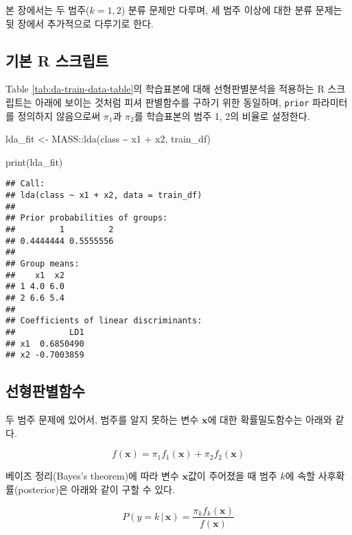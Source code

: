 \documentclass[
]{book}
\newenvironment{Shaded}{\begin{snugshade}}{\end{snugshade}}
\newcommand{\FunctionTok}[1]{\textcolor[rgb]{0.00,0.00,0.00}{#1}}
\newcommand{\NormalTok}[1]{#1}
\newcommand{\OtherTok}[1]{\textcolor[rgb]{0.56,0.35,0.01}{#1}}
\newcommand{\SpecialCharTok}[1]{\textcolor[rgb]{0.00,0.00,0.00}{#1}}
\begin{document}
본 장에서는 두 범주(\(k = 1, 2\)) 분류 문제만 다루며, 세 범주 이상에 대한 분류 문제는 뒷 장에서 추가적으로 다루기로 한다.

\hypertarget{lda-basic-script}{%
\subsection{기본 R 스크립트}\label{lda-basic-script}}

Table \ref{tab:da-train-data-table}의 학습표본에 대해 선형판별분석을 적용하는 R 스크립트는 아래에 보이는 것처럼 피셔 판별함수를 구하기 위한 동일하며, \texttt{prior} 파라미터를 정의하지 않음으로써 \(\pi_1\)과 \(\pi_2\)를 학습표본의 범주 1, 2의 비율로 설정한다.

\begin{Shaded}
\begin{Highlighting}[]
\NormalTok{lda\_fit }\OtherTok{\textless{}{-}}\NormalTok{ MASS}\SpecialCharTok{::}\FunctionTok{lda}\NormalTok{(class }\SpecialCharTok{\textasciitilde{}}\NormalTok{ x1 }\SpecialCharTok{+}\NormalTok{ x2, train\_df)}

\FunctionTok{print}\NormalTok{(lda\_fit)}
\end{Highlighting}
\end{Shaded}

\begin{verbatim}
## Call:
## lda(class ~ x1 + x2, data = train_df)
## 
## Prior probabilities of groups:
##         1         2 
## 0.4444444 0.5555556 
## 
## Group means:
##    x1  x2
## 1 4.0 6.0
## 2 6.6 5.4
## 
## Coefficients of linear discriminants:
##           LD1
## x1  0.6850490
## x2 -0.7003859
\end{verbatim}

\hypertarget{lda-function}{%
\subsection{선형판별함수}\label{lda-function}}

두 범주 문제에 있어서, 범주를 알지 못하는 변수 \(\mathbf{x}\)에 대한 확률밀도함수는 아래와 같다.

\begin{equation*}
f(\mathbf{x}) = \pi_1 f_1(\mathbf{x}) + \pi_2 f_2(\mathbf{x})
\end{equation*}

베이즈 정리(Bayes's theorem)에 따라 변수 \(\mathbf{x}\)값이 주어졌을 때 범주 \(k\)에 속할 사후확률(posterior)은 아래와 같이 구할 수 있다.

\begin{equation}
P(y = k \, | \, \mathbf{x}) = \frac{\pi_k f_k(\mathbf{x})}{f(\mathbf{x})}
\label{eq:lda-posterior}
\end{equation}
\end{document}
